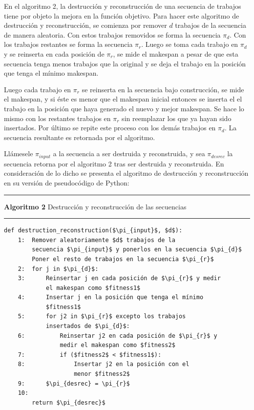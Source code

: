 \documentclass{article}
\begin{document}
\vspace{\baselineskip}
En el algoritmo 2, la destrucción y reconstrucción de una secuencia de trabajos
tiene por objeto la mejora en la función objetivo. Para hacer este algoritmo de
destrucción y reconstrucción, se comienza por remover $d$ trabajos de la secuencia
de manera aleatoria. Con estos trabajos removidos se forma la secuencia $\pi_{d}$.
Con los trabajos restantes se forma la secuencia $\pi_{r}$. Luego se toma cada
trabajo en $\pi_{d}$ y se reinserta en cada posición de $\pi_{r}$, se mide el
makespan a pesar de que esta secuencia tenga menos trabajos que la original y se
deja el trabajo en la posición que tenga el mínimo makespan. \autocite{algMNIG}

\vspace{\baselineskip}
Luego cada 
trabajo en $\pi_{r}$ se reinserta en la secuencia bajo construcción, se mide el
makespan, y si éste es menor que el makespan inicial entonces se inserta el
el trabajo en la posición que haya generado el nuevo y mejor makespan. Se hace lo
mismo con los restantes trabajos en $\pi_{r}$ sin reemplazar los que ya hayan sido
insertados. Por último se repite este proceso con los demás 
trabajos en $\pi_{d}$. La secuencia resultante es retornada por el algoritmo.
\autocite{algMNIG}

\vspace{\baselineskip}
Llámesele $\pi_{input}$ a la secuencia a ser destruida y reconstruida, y
sea $\pi_{desrec}$ la secuencia retorna por el algoritmo 2 tras ser destruida y
reconstruida.
En consideración de lo dicho se presenta el algoritmo de destrucción y 
reconstrucción en su versión de pseudocódigo de Python:

\noindent\noindent
\rule{\linewidth}{0.4pt}

\textbf{Algoritmo 2} Destrucción y reconstrucción de las secuencias

\noindent\noindent
\rule{\linewidth}{0.4pt}

\begin{lstlisting}[mathescape=true]
    def destruction_reconstruction($\pi_{input}$, $d$):
    1:  Remover aleatoriamente $d$ trabajos de la
        secuencia $\pi_{input}$ y ponerlos en la secuencia $\pi_{d}$
        Poner el resto de trabajos en la secuencia $\pi_{r}$
    2:  for j in $\pi_{d}$:
    3:      Reinsertar j en cada posición de $\pi_{r}$ y medir
            el makespan como $fitness1$
    4:      Insertar j en la posición que tenga el mínimo 
            $fitness1$
    5:      for j2 in $\pi_{r}$ excepto los trabajos
            insertados de $\pi_{d}$:
    6:          Reinsertar j2 en cada posición de $\pi_{r}$ y 
                medir el makespan como $fitness2$
    7:          if ($fitness2$ < $fitness1$):
    8:              Insertar j2 en la posición con el 
                    menor $fitness2$
    9:      $\pi_{desrec} = \pi_{r}$
    10:
        return $\pi_{desrec}$
\end{lstlisting}
\end{document}
